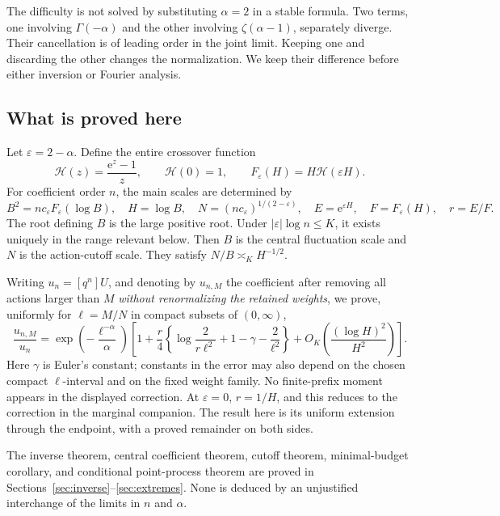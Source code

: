 \documentclass[11pt,a4paper]{article}
\numberwithin{equation}{section}
\theoremstyle{definition}
\theoremstyle{remark}
\newcommand{\eps}{\varepsilon}
\newcommand{\ee}{\mathrm e}
\newcommand{\hc}{\mathcal H}
\newcommand{\FF}{F_{\eps}}
\begin{document}
The difficulty is not solved by substituting \(\alpha=2\) in a stable formula.
Two terms, one involving \(\Gamma(-\alpha)\) and the other involving
\(\zeta(\alpha-1)\), separately diverge. Their cancellation is of leading
order in the joint limit. Keeping one and discarding the other changes the
normalization. We keep their difference before either inversion or Fourier
analysis.

\subsection{What is proved here}
Let \(\eps=2-\alpha\). Define the entire crossover function
\begin{equation}
 \hc(z)=\frac{\ee^z-1}{z},\qquad \hc(0)=1,
 \qquad \FF(H)=H\hc(\eps H).
 \label{eq:Hfunction}
\end{equation}
For coefficient order \(n\), the main scales are determined by
\begin{equation}
 B^2=nc_{\eps}\FF(\log B),\quad H=\log B,\quad
 N=(nc_{\eps})^{1/(2-\eps)},\quad
 E=\ee^{\eps H},\quad F=\FF(H),\quad r=E/F.
 \label{eq:scales-intro}
\end{equation}
The root defining \(B\) is the large positive root. Under
\(|\eps|\log n\le K\), it exists uniquely in the range relevant below.
Then \(B\) is the central fluctuation scale and \(N\) is the action-cutoff
scale. They satisfy \(N/B\asymp_K H^{-1/2}\).

Writing \(u_n=[q^n]U\), and denoting by \(u_{n,M}\) the coefficient after
removing all actions larger than \(M\) \emph{without renormalizing the retained
weights}, we prove, uniformly for \(\ell=M/N\) in compact subsets of
\((0,\infty)\),
\begin{equation}
 \frac{u_{n,M}}{u_n}
 =\exp\left(-\frac{\ell^{-\alpha}}{\alpha}\right)
 \left[
 1+\frac r4\left\{\log\frac{2}{r\ell^2}+1-\gamma-\frac{2}{\ell^2}\right\}
 +O_K\left(\frac{(\log H)^2}{H^2}\right)
 \right].
 \label{eq:main-ratio-intro}
\end{equation}
Here \(\gamma\) is Euler's constant; constants in the error may also depend on
the chosen compact \(\ell\)-interval and on the fixed weight family.
No finite-prefix moment appears in the displayed correction.
At \(\eps=0\), \(r=1/H\), and this reduces to the correction in the marginal
companion. The result here is its uniform extension through the endpoint,
with a proved remainder on both sides.

The inverse theorem, central coefficient theorem, cutoff theorem,
minimal-budget corollary, and conditional point-process theorem are proved
in Sections~\ref{sec:inverse}--\ref{sec:extremes}. None is deduced by an
unjustified interchange of the limits in \(n\) and \(\alpha\).
\end{document}
